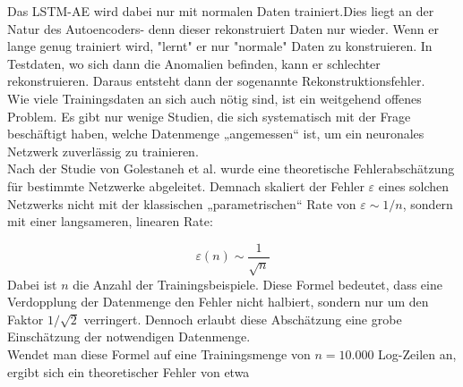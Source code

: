 \documentclass[a4paper,12pt]{article}
\begin{document}
	Das LSTM-AE wird dabei nur mit normalen Daten trainiert.Dies liegt an der Natur des Autoencoders- denn dieser rekonstruiert Daten nur wieder. Wenn er lange genug trainiert wird, "lernt" er nur "normale" Daten zu konstruieren. In Testdaten, wo sich dann die Anomalien befinden, kann er schlechter rekonstruieren. Daraus entsteht dann der sogenannte Rekonstruktionsfehler.
	\\[0.5em]
	Wie viele Trainingsdaten an sich auch nötig sind, ist ein weitgehend offenes Problem. Es gibt nur wenige Studien, die sich systematisch mit der Frage beschäftigt haben, welche Datenmenge „angemessen“ ist, um ein neuronales Netzwerk zuverlässig zu trainieren. 
	\\[0.5em]
	Nach der Studie von Golestaneh et al. \cite{Golestaneh2021} wurde eine theoretische Fehlerabschätzung für bestimmte Netzwerke abgeleitet. Demnach skaliert der Fehler $\varepsilon$ eines solchen Netzwerks nicht mit der klassischen „parametrischen“ Rate von $\varepsilon \sim 1/n$, sondern mit einer langsameren, linearen Rate:
	
	\[
	\varepsilon(n) \sim \frac{1}{\sqrt{n}}
	\]
	Dabei ist \(n\) die Anzahl der Trainingsbeispiele. Diese Formel bedeutet, dass eine Verdopplung der Datenmenge den Fehler nicht halbiert, sondern nur um den Faktor \(1/\sqrt{2}\) verringert. Dennoch erlaubt diese Abschätzung eine grobe Einschätzung der notwendigen Datenmenge.
	\\[0.5em]
	Wendet man diese Formel auf eine Trainingsmenge von $n = 10.000$ Log-Zeilen an, ergibt sich ein theoretischer Fehler von etwa
	
\end{document}
